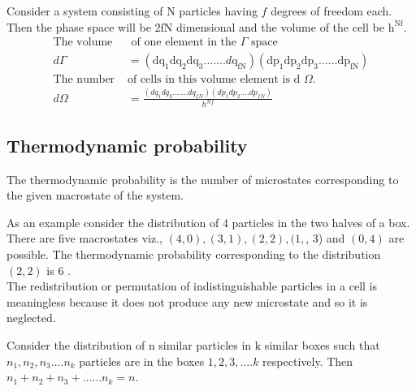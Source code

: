  \par Consider a system consisting of $\mathrm{N}$ particles having $f$ degrees of freedom each. Then the phase space will be $2 \mathrm{fN}$ dimensional and the volume of the cell be $\mathrm{h}^{\mathrm{Nf}}$.
 \begin{align*}
  \text{The volume}&\text{ of one element in the $\Gamma$ space}\\
  d\Gamma&=\left(\mathrm{dq}_{1} \mathrm{dq}_{2} \mathrm{dq}_{3} \ldots \ldots . d \mathrm{q}_{\mathrm{fN}}\right)\left(\mathrm{dp}_{1} \mathrm{dp}_{2} \mathrm{dp}_{3} \ldots \ldots \mathrm{dp}_{\mathrm{fN}}\right)\\
  \text{The number }&\text{of cells in this volume element is d $\Omega$.}
 \\
 d \Omega&=\frac{\left(d q_{1} d q_{2} \ldots \ldots . d q_{f N}\right)\left(d p_{1} d p_{2} \ldots . d p_{f N}\right)}{h^{N f}}
 \end{align*}
\subsection{ Thermodynamic probability}
 The thermodynamic probability is the number of microstates corresponding to the given macrostate of the system.
 
 As an example consider the distribution of 4 particles in the two halves of a box. There are five macrostates viz., $(4,0),(3,1),(2,2),(1,$, 3) and $(0,4)$ are possible. The thermodynamic probability corresponding to the distribution $(2,2)$ is 6 .\\
 The redistribution or permutation of indistinguishable particles in a cell is meaningless because it does not produce any new microstate and so it is neglected.
 
 Consider the distribution of $\mathrm{n}$ similar particles in $\mathrm{k}$ similar boxes such that $n_{1}, n_{2}, n_{3} \ldots . n_{k}$ particles are in the boxes $1,2,3, \ldots . k$ respectively. Then $n_{1}+n_{2}+n_{3}+\ldots \ldots n_{k}=n$.
 

